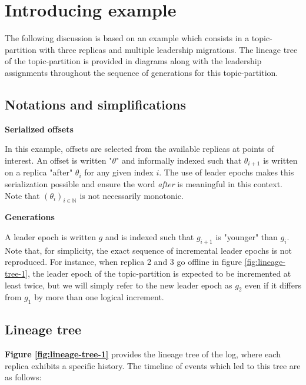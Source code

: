 \documentclass{article}
\begin{document}
\section{Introducing example}

The following discussion is based on an example which consists in a topic-partition with three replicas and multiple leadership migrations. The lineage tree of the topic-partition is provided in diagrams along with the leadership assignments throughout the sequence of generations for this topic-partition.

\subsection{Notations and simplifications}

\textbf{Serialized offsets}

In this example, offsets are selected from the available replicas at points of interest. An offset is written "$\theta$" and informally indexed such that $\theta_{i+1}$ is written on a replica "after" $\theta_i$ for any given index $i$. The use of leader epochs makes this serialization possible and ensure the word \textit{after} is meaningful in this context. Note that $(\theta_i)_{i \in \mathbb{N}}$ is not necessarily monotonic. 

\textbf{Generations}

A leader epoch is written $g$ and is indexed such that $g_{i+1}$ is "younger" than $g_i$. Note that, for simplicity, the exact sequence of incremental leader epochs is not reproduced. For instance, when replica 2 and 3 go offline in figure \ref{fig:lineage-tree-1}, the leader epoch of the topic-partition is expected to be incremented at least twice, but we will simply refer to the new leader epoch as $g_2$ even if it differs from $g_1$ by more than one logical increment.

\subsection{Lineage tree}

\label{lineage_tree}
\textbf{Figure \ref{fig:lineage-tree-1}} provides the lineage tree of the log, where each replica exhibits a specific history.
The timeline of events which led to this tree are as follows:
\end{document}
